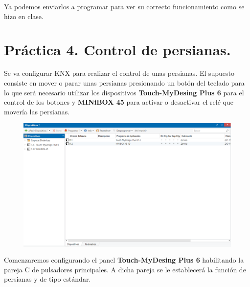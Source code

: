 \documentclass[10pt]{article}
\begin{document}
Ya podemos enviarlos a programar para ver su correcto funcionamiento como se hizo en clase. \\


\section{Práctica 4. Control de persianas.} 
Se va configurar KNX para realizar el control de unas persianas. El supuesto consiste en mover o parar unas persianas presionando un botón del teclado para lo que será necesario utilizar los dispositivos \textbf{Touch-MyDesing Plus 6} para el control de los botones y \textbf{MINiBOX 45} para activar o desactivar el relé que movería las persianas. \\

\begin{figure}[H]
	\begin{center}
	 		\includegraphics[width = 1.00\textwidth]{Imagenes/img35}
	\end{center} 
\end{figure}

Comenzaremos configurando el panel \textbf{Touch-MyDesing Plus 6} habilitando la pareja C de pulsadores principales. A dicha pareja se le establecerá la función de persianas y de tipo estándar. \\
\end{document}
